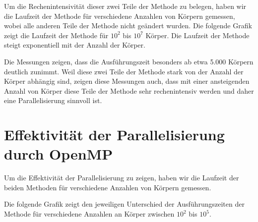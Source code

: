 \documentclass[
  ngerman,
  color=8c,
  submission,
  boxarc,
  fleqn,
]{rubos-tuda-template}
\begin{document}
Um die Rechenintensivität dieser zwei Teile der Methode zu belegen, haben wir die Laufzeit der Methode für verschiedene Anzahlen von Körpern gemessen, wobei alle anderen Teile der Methode nicht geändert wurden. Die folgende Grafik zeigt die Laufzeit der Methode für $10^2$ bis $10^7$ Körper. Die Laufzeit der Methode steigt exponentiell mit der Anzahl der Körper. 

Die Messungen zeigen, dass die Ausführungszeit besonders ab etwa 5.000 Körpern deutlich zunimmt.
Weil diese zwei Teile der Methode stark von der Anzahl der Körper abhängig sind, zeigen diese Messungen auch, dass mit einer ansteigenden Anzahl von Körper diese Teile der Methode sehr rechenintensiv werden und daher eine Parallelisierung sinnvoll ist.

\section{Effektivität der Parallelisierung durch OpenMP}



Um die Effektivität der Parallelisierung zu zeigen, haben wir die Laufzeit der beiden Methoden für verschiedene Anzahlen von Körpern gemessen. 

Die folgende Grafik zeigt den jeweiligen Unterschied der Ausführungszeiten der Methode für verschiedene Anzahlen an Körper zwischen $10^2$ bis $10^5$.
\end{document}
